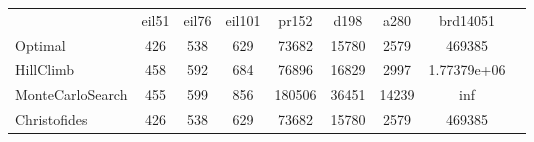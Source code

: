 \begin{tabular}[ht]{|l||c|c|c|c|c|c|c|H}
 & eil51 & eil76 & eil101 & pr152 & d198 & a280 & brd14051 & \\  
Optimal &426 & 538 & 629 & 73682 & 15780 & 2579 & 469385 & \\ 
HillClimb &458 & 592 & 684 & 76896 & 16829 & 2997 & 1.77379e+06 & \\ 
MonteCarloSearch &455 & 599 & 856 & 180506 & 36451 & 14239 & inf & \\ 
Christofides &426 & 538 & 629 & 73682 & 15780 & 2579 & 469385 & \\ 
\end{tabular}